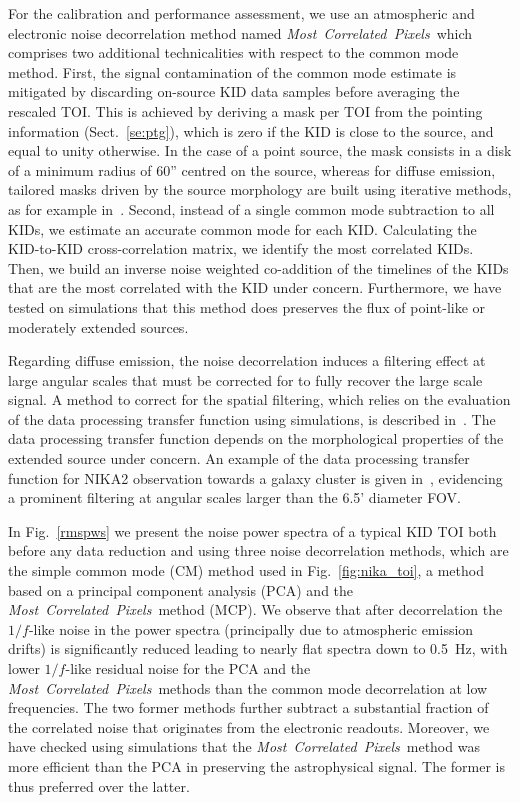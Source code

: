 \documentclass[traditionalabstract]{aa}
\newcommand{\cmoneb}{\emph{Most~Correlated~Pixels}}
\newcommand{\lp}[1]{#1}
\newcommand{\rev}[1]{#1}
\begin{document}
{\lp For the calibration and performance assessment, we use an
atmospheric and electronic noise
decorrelation method named \cmoneb\, which comprises two
additional technicalities with respect to the common mode
method.} First, the signal contamination of the common mode estimate
is mitigated by discarding on-source KID data samples before averaging
the rescaled TOI. {\rev This is achieved by deriving a mask per TOI
from the pointing information (Sect.~\ref{se:ptg}), which is zero if
the KID is close to the source, and equal to unity otherwise. In the case of a
point source, the mask consists in a disk of a minimum radius of 60''
centred on the source, whereas for diffuse emission, tailored masks
driven by the source morphology are built using iterative methods, as
for example in~\citet{Ruppin2017}.}
Second, instead of a single common mode subtraction to
all KIDs, we estimate an accurate common mode for each
KID. Calculating the KID-to-KID cross-correlation matrix, we
identify the most correlated KIDs. Then, we build an
inverse noise weighted co-addition of the timelines of the %
KIDs that are the most correlated with the KID under
concern. Furthermore, we have tested on simulations that this method
does preserves the flux of {\lp point-like or moderately extended
sources.}

{\rev Regarding diffuse emission, the noise decorrelation induces a
filtering effect at large angular scales that must be corrected
for to fully recover the large scale signal. A method to correct for the
spatial filtering, which relies on the evaluation of the data
processing transfer function using simulations, is
described in~\citet{Adam2015}. The data processing transfer function
depends on the morphological properties of the extended source under
concern. 
An example of the data processing transfer function for
NIKA2 observation towards a galaxy cluster is given
in~\citet{Ruppin2018}, evidencing a prominent filtering at
angular scales larger than the 6.5' diameter FOV.} 

In Fig.~\ref{rmspws} we present the noise power spectra of
a typical KID TOI both before any data reduction and using three noise
decorrelation methods, which are the simple common mode (CM) method
used in Fig.~\ref{fig:nika_toi}, a method based on a principal component
analysis (PCA) and the \cmoneb\ method (MCP). We observe that after decorrelation the
$1/f$-like noise in the power spectra (principally due to atmospheric
emission drifts)
is significantly reduced leading to nearly flat spectra down to {\lp
0.5~Hz}, with lower $1/f$-like residual noise for the PCA and
the \cmoneb\ methods than the common mode decorrelation at low
frequencies. {\rev The two former methods further subtract a
substantial fraction of the correlated noise that originates from the
electronic readouts.} {\lp Moreover, we have checked using simulations that
the \cmoneb\ method was more efficient than the PCA in preserving the
astrophysical signal. The former is thus preferred over the latter.} 
\end{document}
